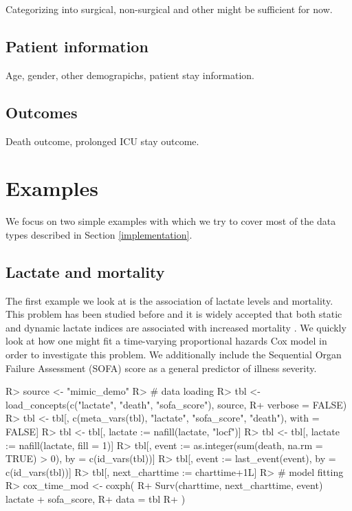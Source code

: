 \documentclass[
]{jss}
\begin{document}
Categorizing into surgical, non-surgical and other might be sufficient
for now.

\hypertarget{patient-information}{%
\subsection{Patient information}\label{patient-information}}

Age, gender, other demograpichs, patient stay information.

\hypertarget{outcomes}{%
\subsection{Outcomes}\label{outcomes}}

Death outcome, prolonged ICU stay outcome.

\hypertarget{examples}{%
\section{Examples}\label{examples}}

We focus on two simple examples with which we try to cover most of the
data types described in Section \ref{implementation}.

\hypertarget{lactate-and-mortality}{%
\subsection{Lactate and mortality}\label{lactate-and-mortality}}

The first example we look at is the association of lactate levels and
mortality. This problem has been studied before and it is widely
accepted that both static and dynamic lactate indices are associated
with increased mortality
\citep{haas2016severe, nichol2011dynamic, van2013cumulative}. We quickly
look at how one might fit a time-varying proportional hazards Cox model
\citep{therneau2015package} in order to investigate this problem. We
additionally include the Sequential Organ Failure Assessment (SOFA)
score \citep{vincent1996sofa} as a general predictor of illness
severity.

\begin{CodeChunk}

\begin{CodeInput}
R> source <- "mimic_demo"
R> # data loading
R> tbl <- load_concepts(c("lactate", "death", "sofa_score"), source,
R+                      verbose = FALSE)
R> tbl <- tbl[, c(meta_vars(tbl), "lactate", "sofa_score", "death"), with = FALSE]
R> tbl <- tbl[, lactate := nafill(lactate, "locf")]
R> tbl <- tbl[, lactate := nafill(lactate, fill = 1)]
R> tbl[, event := as.integer(sum(death, na.rm = TRUE) > 0), by = c(id_vars(tbl))]
R> tbl[, event := last_event(event), by = c(id_vars(tbl))]
R> tbl[, next_charttime := charttime+1L]
R> # model fitting
R> cox_time_mod <- coxph(
R+   Surv(charttime, next_charttime, event) ~ lactate + sofa_score,
R+   data = tbl
R+ )
\end{CodeInput}
\end{CodeChunk}
\end{document}
